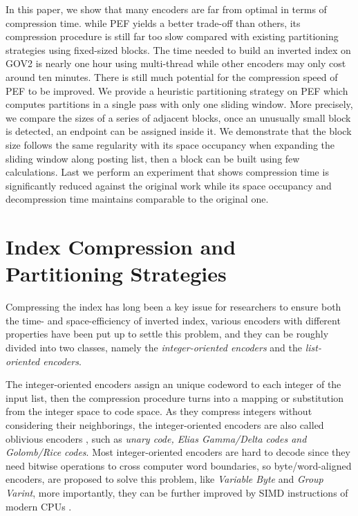 \documentclass[runningheads,a4paper]{llncs}
\begin{document}
In this paper, we show that many encoders are far from optimal in terms of compression time.
while PEF yields a better trade-off than others, its compression procedure is still far too slow compared with existing partitioning strategies using fixed-sized blocks.
The time needed to build an inverted index on GOV2 is nearly one hour using multi-thread while other encoders may only cost around ten minutes.
There is still much potential for the compression speed of PEF to be improved.
We provide a heuristic partitioning strategy on PEF which computes partitions in a single pass with only one sliding window.
More precisely, we compare the sizes of a series of adjacent blocks, once an unusually small block is detected, an endpoint can be assigned inside it.
We demonstrate that the block size follows the same regularity with its space occupancy when expanding the sliding window along posting list, then a block can be built using few calculations.
{\color{red}{say something about the collection, gov2 and common crawl.}}
Last we perform an experiment that shows compression time is significantly reduced against the original work while its space occupancy and decompression time maintains comparable to the original one.

\section{Index Compression and Partitioning Strategies}\label{sec:background}

Compressing the index has long been a key issue for researchers to ensure both the time- and space-efficiency of inverted index, various encoders with different properties have been put up to settle this problem, and they can be roughly divided into two classes, namely the \textit{integer-oriented encoders} and the \textit{list-oriented encoders}.

The integer-oriented encoders assign an unique codeword to each integer of the input list, then the compression procedure turns into a mapping or substitution from the integer space to code space.
As they compress integers without considering their neighborings, the integer-oriented encoders are also called oblivious encoders \cite{catena2014inverted}, such as \textit{unary code, Elias Gamma/Delta codes \emph{and} Golomb/Rice codes}.
Most integer-oriented encoders are hard to decode since they need bitwise operations to cross computer word boundaries, so byte/word-aligned encoders, are proposed to solve this problem, like \textit{Variable Byte} and \textit{Group Varint}, more importantly, they can be further improved by SIMD instructions of modern CPUs \cite{stepanov2011simd,trotman2014compression}.
\end{document}
